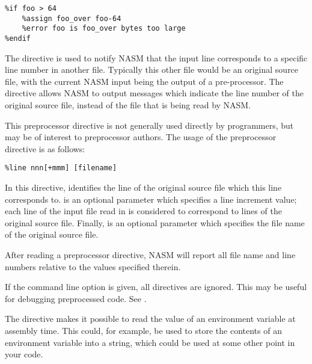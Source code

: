 \begin{lstlisting}
%if foo > 64
    %assign foo_over foo-64
    %error foo is foo_over bytes too large
%endif
\end{lstlisting}



The  directive is used to notify NASM that the input line
corresponds to a specific line number in another file. Typically
this other file would be an original source file, with the current
NASM input being the output of a pre-processor. The 
directive allows NASM to output messages which indicate the line
number of the original source file, instead of the file that is being
read by NASM.

This preprocessor directive is not generally used directly by
programmers, but may be of interest to preprocessor authors. The
usage of the  preprocessor directive is as follows:

\begin{lstlisting}
%line nnn[+mmm] [filename]
\end{lstlisting}

In this directive,  identifies the line of the original source
file which this line corresponds to.  is an optional parameter
which specifies a line increment value; each line of the input file
read in is considered to correspond to  lines of the original
source file. Finally,  is an optional parameter which
specifies the file name of the original source file.

After reading a  preprocessor directive, NASM will report
all file name and line numbers relative to the values specified
therein.

If the command line option  is given, all 
directives are ignored. This may be useful for debugging preprocessed
code. See .


The  directive makes it possible to read the
value of an environment variable at assembly time. This could, for example,
be used to store the contents of an environment variable into a string, which
could be used at some other point in your code.

